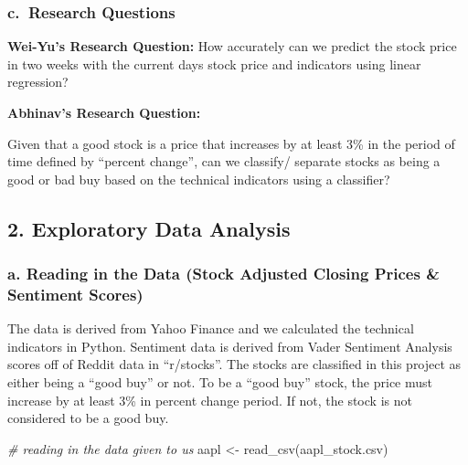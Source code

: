 \documentclass[
]{article}
\newenvironment{Shaded}{\begin{snugshade}}{\end{snugshade}}
\newcommand{\CommentTok}[1]{\textcolor[rgb]{0.56,0.35,0.01}{\textit{#1}}}
\newcommand{\FunctionTok}[1]{\textcolor[rgb]{0.00,0.00,0.00}{#1}}
\newcommand{\NormalTok}[1]{#1}
\newcommand{\OtherTok}[1]{\textcolor[rgb]{0.56,0.35,0.01}{#1}}
\newcommand{\StringTok}[1]{\textcolor[rgb]{0.31,0.60,0.02}{#1}}
\begin{document}
\hypertarget{c.-research-questions}{%
\subsubsection{c.~Research Questions}\label{c.-research-questions}}

\textbf{Wei-Yu's Research Question:} How accurately can we predict the
stock price in two weeks with the current day\textquotesingle s stock
price and indicators using linear regression?

\textbf{Abhinav's Research Question:}

Given that a good stock is a price that increases by at least 3\% in the
period of time defined by ``percent change'', can we classify/ separate
stocks as being a good or bad buy based on the technical indicators
using a classifier?

\hypertarget{exploratory-data-analysis}{%
\subsection{2. Exploratory Data
Analysis}\label{exploratory-data-analysis}}

\hypertarget{a.-reading-in-the-data-stock-adjusted-closing-prices-sentiment-scores}{%
\subsubsection{a. Reading in the Data (Stock Adjusted Closing Prices \&
Sentiment
Scores)}\label{a.-reading-in-the-data-stock-adjusted-closing-prices-sentiment-scores}}

The data is derived from Yahoo Finance and we calculated the technical
indicators in Python. Sentiment data is derived from Vader Sentiment
Analysis scores off of Reddit data in ``r/stocks''. The stocks are
classified in this project as either being a ``good buy'' or not. To be
a ``good buy'' stock, the price must increase by at least 3\% in percent
change period. If not, the stock is not considered to be a good buy.

\begin{Shaded}
\begin{Highlighting}[]
\CommentTok{\# reading in the data given to us}
\NormalTok{aapl }\OtherTok{\textless{}{-}} \FunctionTok{read\_csv}\NormalTok{(}\StringTok{\textquotesingle{}aapl\_stock.csv\textquotesingle{}}\NormalTok{)}
\end{Highlighting}
\end{Shaded}
\end{document}
